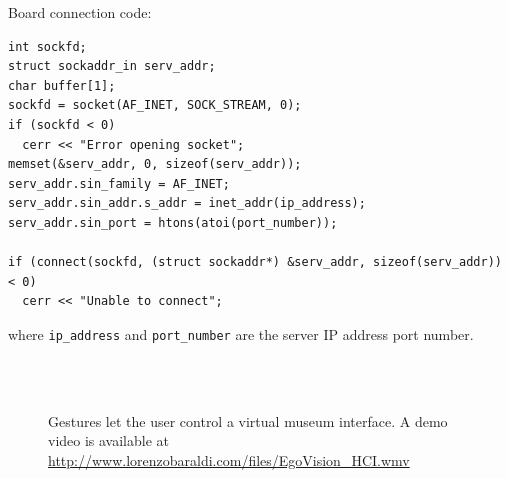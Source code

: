 Board connection code:
\begin{lstlisting}[frame=single]
int sockfd;
struct sockaddr_in serv_addr;
char buffer[1];
sockfd = socket(AF_INET, SOCK_STREAM, 0);
if (sockfd < 0)
  cerr << "Error opening socket";
memset(&serv_addr, 0, sizeof(serv_addr));
serv_addr.sin_family = AF_INET;
serv_addr.sin_addr.s_addr = inet_addr(ip_address);
serv_addr.sin_port = htons(atoi(port_number));

if (connect(sockfd, (struct sockaddr*) &serv_addr, sizeof(serv_addr)) < 0)
  cerr << "Unable to connect";
\end{lstlisting}
where \verb+ip_address+ and \verb+port_number+ are the server IP address port number.
\begin{figure}
\centering
{} \\
 \\
\caption{Gestures let the user control a virtual museum interface. A demo video is available at \url{http://www.lorenzobaraldi.com/files/EgoVision_HCI.wmv}}
\label{fig:projector}
\end{figure}